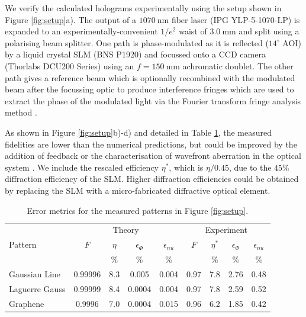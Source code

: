 \documentclass[amsmath,onecolumn,superscriptaddress,notitlepage]{revtex4-1}
\begin{document}
We verify the calculated holograms experimentally using the setup shown in Figure \ref{fig:setup}a). The output of a $1070~\text{nm}$ fiber laser (IPG YLP-5-1070-LP) is expanded to an experimentally-convenient $1/e^{2}$ waist of $3.0~\text{mm}$ and split using a polarising beam splitter. One path is phase-modulated as it is reflected ($14^{\circ}$ AOI) by a liquid crystal SLM (BNS P1920) and focussed onto a CCD camera (Thorlabs DCU200 Series) using an $f=150~\text{mm}$ achromatic doublet. The other path gives a reference beam which is optionally recombined with the modulated beam after the focussing optic to produce interference fringes which are used to extract the phase of the modulated light via the Fourier transform fringe analysis method \cite{Takeda+82}.

As shown in Figure \ref{fig:setup}b)-d) and detailed in Table \ref{tabular:results2}, the measured fidelities are lower than the numerical predictions, but could be improved by the addition of feedback \cite{Bruce+11,Bruce+15} or the characterisation of wavefront aberration in the optical system \cite{Cizmar+10,Zupancic+16}. We include the rescaled efficiency $\eta^{*}$, which is $\eta/0.45$, due to the $45\%$ diffraction efficiency of the SLM.  Higher diffraction efficiencies could be obtained by replacing the SLM with a micro-fabricated diffractive optical element.


\begin{table}[htb!]
\centering
\caption{Error metrics for the measured patterns in Figure \ref{fig:setup}. \label{tabular:results2}}
  \begin{tabular}{ | l | c c c c | c c c c |}
  \hline
  & \multicolumn{4}{c|}{Theory} & \multicolumn{4}{c|}{Experiment} \\
  Pattern & $F$ & $\eta$ & $\epsilon_{\Phi}$ & $\epsilon_{nu}$ & $F$ & $\eta^{*}$ & $\epsilon_{\Phi}$ & $\epsilon_{nu}$ \\
  & & \% & \% & \% & & \% & \% & \% \\ \hline
  Gaussian Line & 0.99996 & 8.3 & 0.005 & 0.004 & 0.97 & 7.8 & 2.76 & 0.48 \\ %
  Laguerre Gauss & 0.99999 & 8.4 & 0.0004 & 0.004 & 0.97 & 7.8 & 2.59 & 0.52 \\ %
  Graphene & 0.9996 & 7.0 & 0.0004 & 0.015 & 0.96 & 6.2 & 1.85 & 0.42 \\ \hline
  \end{tabular}
\end{table}
\end{document}
